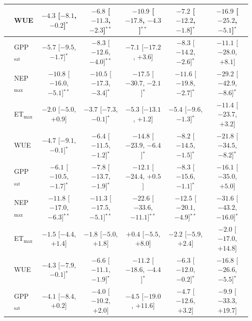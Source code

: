 \begin{table}[htbp]
{\begin{tabular}{llccccc}
 & WUE & $-4.3$ {\tiny[$-8.1$, $-0.2$]}$^{*}$ & $-6.8$ {\tiny[$-11.3$, $-2.3$]}$^{**}$ & $-10.9$ {\tiny[$-17.8$, $-4.3$]}$^{**}$ & $-7.2$ {\tiny[$-12.2$, $-1.8$]}$^{*}$ & $-16.9$ {\tiny[$-25.2$, $-5.1$]}$^{*}$ \\
\midrule
{} & GPP$_\mathrm{sat}$ & $-5.7$ {\tiny[$-9.5$, $-1.7$]}$^{*}$ & $-8.3$ {\tiny[$-12.6$, $-4.0$]}$^{**}$ & $-7.1$ {\tiny[$-17.2$, $+3.6$]} & $-8.3$ {\tiny[$-14.2$, $-2.6$]}$^{*}$ & $-11.1$ {\tiny[$-28.0$, $+8.1$]} \\
 & NEP$_\mathrm{max}$ & $-10.8$ {\tiny[$-16.0$, $-5.1$]}$^{**}$ & $-10.5$ {\tiny[$-17.3$, $-3.4$]}$^{*}$ & $-17.5$ {\tiny[$-30.7$, $-2.1$]}$^{*}$ & $-11.6$ {\tiny[$-19.8$, $-2.7$]}$^{*}$ & $-29.2$ {\tiny[$-42.9$, $-8.6$]}$^{*}$ \\
 & ET$_\mathrm{max}$ & $-2.0$ {\tiny[$-5.0$, $+0.9$]} & $-3.7$ {\tiny[$-7.3$, $-0.1$]}$^{*}$ & $-5.3$ {\tiny[$-13.1$, $+1.2$]} & $-5.4$ {\tiny[$-9.6$, $-1.3$]}$^{*}$ & $-11.4$ {\tiny[$-23.7$, $+3.2$]} \\
 & WUE & $-4.7$ {\tiny[$-9.1$, $-0.1$]}$^{*}$ & $-6.4$ {\tiny[$-11.5$, $-1.2$]}$^{*}$ & $-14.8$ {\tiny[$-23.9$, $-6.4$]}$^{*}$ & $-8.2$ {\tiny[$-14.5$, $-1.5$]}$^{*}$ & $-21.8$ {\tiny[$-34.5$, $-8.2$]}$^{*}$ \\
\midrule
{} & GPP$_\mathrm{sat}$ & $-6.1$ {\tiny[$-10.5$, $-1.7$]}$^{*}$ & $-7.8$ {\tiny[$-13.7$, $-1.9$]}$^{*}$ & $-12.1$ {\tiny[$-24.4$, $+0.5$]} & $-8.3$ {\tiny[$-15.6$, $-1.1$]}$^{*}$ & $-16.1$ {\tiny[$-35.0$, $+5.0$]} \\
 & NEP$_\mathrm{max}$ & $-11.8$ {\tiny[$-17.0$, $-6.3$]}$^{**}$ & $-11.3$ {\tiny[$-17.5$, $-5.1$]}$^{**}$ & $-22.6$ {\tiny[$-33.6$, $-11.1$]}$^{**}$ & $-12.5$ {\tiny[$-20.1$, $-4.9$]}$^{**}$ & $-31.6$ {\tiny[$-43.2$, $-16.0$]}$^{*}$ \\
 & ET$_\mathrm{max}$ & $-1.5$ {\tiny[$-4.4$, $+1.4$]} & $-1.8$ {\tiny[$-5.0$, $+1.8$]} & $+0.4$ {\tiny[$-5.5$, $+8.0$]} & $-2.2$ {\tiny[$-5.9$, $+2.4$]} & $-2.0$ {\tiny[$-17.0$, $+14.8$]} \\
 & WUE & $-4.3$ {\tiny[$-7.9$, $-0.1$]}$^{*}$ & $-6.6$ {\tiny[$-11.1$, $-1.9$]}$^{*}$ & $-11.2$ {\tiny[$-18.6$, $-4.4$]}$^{*}$ & $-6.3$ {\tiny[$-12.0$, $-0.2$]}$^{*}$ & $-16.8$ {\tiny[$-26.6$, $-5.5$]}$^{*}$ \\
\midrule
{} & GPP$_\mathrm{sat}$ & $-4.1$ {\tiny[$-8.4$, $+0.2$]} & $-4.0$ {\tiny[$-10.2$, $+2.0$]} & $-4.5$ {\tiny[$-19.0$, $+11.6$]} & $-4.7$ {\tiny[$-12.6$, $+3.2$]} & $-9.9$ {\tiny[$-33.3$, $+19.7$]} \\

\end{tabular}}
\end{table}
